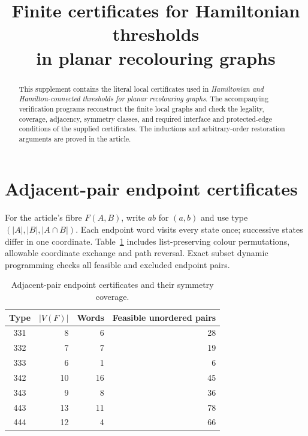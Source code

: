 \documentclass[11pt]{article}
\title{Finite certificates for Hamiltonian thresholds\\in planar recolouring graphs}
\author{}
\date{}
\numberwithin{equation}{section}
\numberwithin{table}{section}
\begin{document}
\maketitle
\begin{abstract}
This supplement contains the literal local certificates used in
\emph{Hamiltonian and Hamilton-connected thresholds for planar recolouring graphs}.
The accompanying verification programs reconstruct the finite local graphs and
check the legality, coverage, adjacency, symmetry classes, and required
interface and protected-edge conditions of the supplied certificates. The
inductions and arbitrary-order restoration arguments are proved in the article.
\end{abstract}
\appendix
\section{Adjacent-pair endpoint certificates}
\label{app:pair-five-certificates}
For the article's fibre $F(A,B)$, write $ab$ for $(a,b)$ and use type
$(|A|,|B|,|A\cap B|)$. Each endpoint word visits every state once;
successive states differ in one coordinate. Table~\ref{tab:pair-five-counts}
includes list-preserving colour permutations, allowable coordinate
exchange and path reversal. Exact subset dynamic programming checks
all feasible and excluded endpoint pairs.

\begin{table}[htbp]
\centering
\caption{Adjacent-pair endpoint certificates and their symmetry coverage.}
\label{tab:pair-five-counts}
\begin{tabular}{crrr}
\toprule
Type & $|V(F)|$ & Words & Feasible unordered pairs\\
\midrule
 331&8&6&28\\
 332&7&7&19\\
 333&6&1&6\\
 342&10&16&45\\
 343&9&8&36\\
 443&13&11&78\\
 444&12&4&66\\
\bottomrule
\end{tabular}
\end{table}
\end{document}
